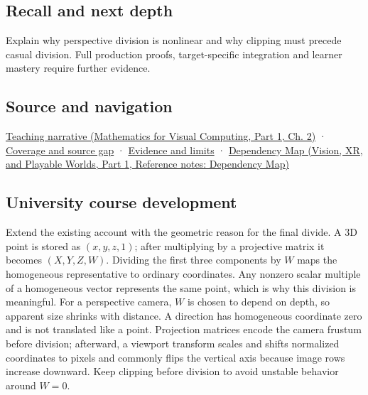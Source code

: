 \subsection{Recall and next depth}\label{appendix-cb3b26862282-recall-and-next-depth}

\hypertarget{appendix-cb3b26862282-recall-and-next-depth}{}

Explain why perspective division is nonlinear and why clipping must precede casual division. Full production proofs, target-specific integration and learner mastery require further evidence.

\subsection{Source and navigation}\label{appendix-cb3b26862282-source-and-navigation}

\hypertarget{appendix-cb3b26862282-source-and-navigation}{}

\href{../02-Mathematics-for-Visual-Computing-P01/main.pdf\#nameddest=01-foundations-i-ch018-homogeneous-coordinates-preserve-the-role-of-a-location}{Teaching narrative (Mathematics for Visual Computing, Part 1, Ch. 2)} · \hyperref[appendix-fd090d982a15-phase-6---parts-501-600]{Coverage and source gap} · \hyperref[appendix-a103e7846d21-phase-6---source-analysis-and-verification]{Evidence and limits} · \href{../07-Vision-XR-and-Playable-Worlds-P01/main.pdf\#nameddest=appendix-4ad47bdd269a}{Dependency Map (Vision, XR, and Playable Worlds, Part 1, Reference notes: Dependency Map)}

\subsection{University course development}\label{appendix-cb3b26862282-university-course-development}

\hypertarget{appendix-cb3b26862282-university-course-development}{}

Extend the existing account with the geometric reason for the final divide. A 3D point is stored as \((x,y,z,1)\); after multiplying by a projective matrix it becomes \((X,Y,Z,W)\). Dividing the first three components by \(W\) maps the homogeneous representative to ordinary coordinates. Any nonzero scalar multiple of a homogeneous vector represents the same point, which is why this division is meaningful. For a perspective camera, \(W\) is chosen to depend on depth, so apparent size shrinks with distance. A direction has homogeneous coordinate zero and is not translated like a point. Projection matrices encode the camera frustum before division; afterward, a viewport transform scales and shifts normalized coordinates to pixels and commonly flips the vertical axis because image rows increase downward. Keep clipping before division to avoid unstable behavior around \(W=0\).


